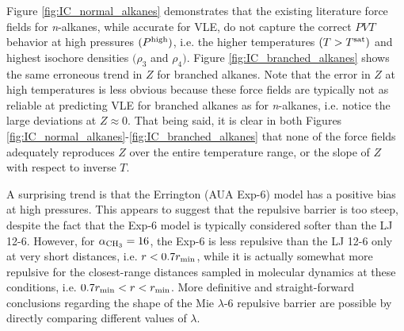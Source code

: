 \documentclass[preprint,letterpaper,floatfix,citeautoscript,aip,jcp]{revtex4-1}
\begin{document}
Figure \ref{fig:IC_normal_alkanes} demonstrates that the existing literature force fields for \textit{n}-alkanes, while accurate for VLE, do not capture the correct $PVT$ behavior at high pressures $(P^{\rm high})$, i.e. the  higher temperatures $(T > T^{\rm sat})$ and highest isochore densities $(\rho_3$ and $\rho_4)$. Figure \ref{fig:IC_branched_alkanes} shows the same erroneous trend in $Z$ for branched alkanes. Note that the error in $Z$ at high temperatures is less obvious because these force fields are typically not as reliable at predicting VLE for branched alkanes as for \textit{n}-alkanes, i.e. notice the large deviations at $Z \approx 0$. That being said, it is clear in both Figures \ref{fig:IC_normal_alkanes}-\ref{fig:IC_branched_alkanes} that none of the force fields adequately reproduces $Z$ over the entire temperature range, or the slope of $Z$ with respect to inverse $T$.




A surprising trend is that the Errington (AUA Exp-6) model has a positive bias at high pressures. This appears to suggest that the repulsive barrier is too steep, despite the fact that the Exp-6 model is typically considered softer than the LJ 12-6. However, for $\alpha_{\rm CH_3} = 16$, the Exp-6 is less repulsive than the LJ 12-6 only at very short distances, i.e. $r < 0.7 r_{\rm min}$, while it is actually somewhat more repulsive for the closest-range distances sampled in molecular dynamics at these conditions, i.e. $0.7 r_{\rm min} < r < r_{\rm min}$.  
%
More definitive and straight-forward conclusions regarding the shape of the Mie $\lambda$-6 repulsive barrier are possible by directly comparing different values of $\lambda$. 
 
\end{document}
